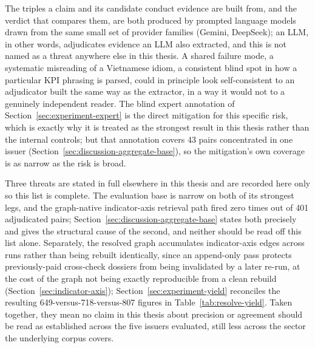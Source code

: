 \documentclass[fontsize=12pt,oneside,headings=small]{scrreprt}
\begin{document}
The triples a claim and its candidate conduct evidence are built from, and the verdict that compares them, are both produced by prompted language models drawn from the same small set of provider families (Gemini, DeepSeek); an LLM, in other words, adjudicates evidence an LLM also extracted, and this is not named as a threat anywhere else in this thesis. A shared failure mode, a systematic misreading of a Vietnamese idiom, a consistent blind spot in how a particular KPI phrasing is parsed, could in principle look self-consistent to an adjudicator built the same way as the extractor, in a way it would not to a genuinely independent reader. The blind expert annotation of Section~\ref{sec:experiment-expert} is the direct mitigation for this specific risk, which is exactly why it is treated as the strongest result in this thesis rather than the internal controls; but that annotation covers 43 pairs concentrated in one issuer (Section~\ref{sec:discussion-aggregate-base}), so the mitigation's own coverage is as narrow as the risk is broad.

Three threats are stated in full elsewhere in this thesis and are recorded here only so this list is complete. The evaluation base is narrow on both of its strongest legs, and the graph-native indicator-axis retrieval path fired zero times out of 401 adjudicated pairs; Section~\ref{sec:discussion-aggregate-base} states both precisely and gives the structural cause of the second, and neither should be read off this list alone. Separately, the resolved graph accumulates indicator-axis edges across runs rather than being rebuilt identically, since an append-only pass protects previously-paid cross-check dossiers from being invalidated by a later re-run, at the cost of the graph not being exactly reproducible from a clean rebuild (Section~\ref{sec:indicator-axis}); Section~\ref{sec:experiment-yield} reconciles the resulting 649-versus-718-versus-807 figures in Table~\ref{tab:resolve-yield}. Taken together, they mean no claim in this thesis about precision or agreement should be read as established across the five issuers evaluated, still less across the sector the underlying corpus covers.
\end{document}
